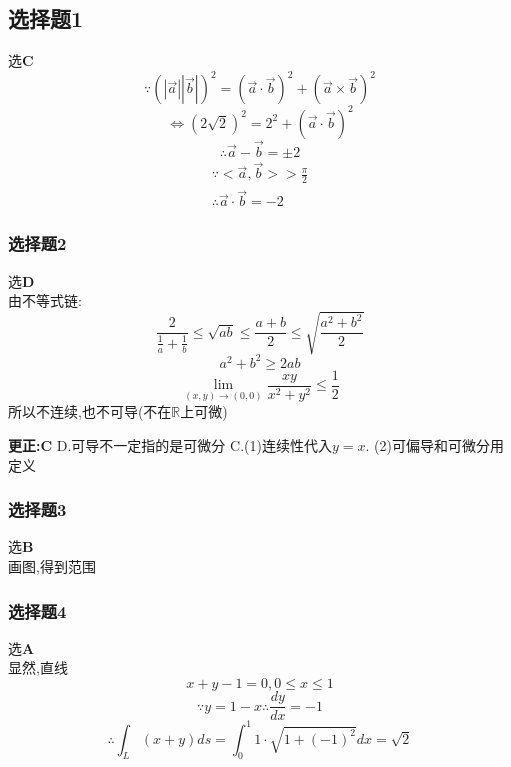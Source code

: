 \documentclass[a4paper,12pt]{ctexrep}
\begin{document}
\subsection{选择题1}
选\textbf{C}
\begin{equation*}
	\because\left(|\overrightarrow{a}||\overrightarrow{b}|\right)^2=\left(\overrightarrow{a}\cdot\overrightarrow{b}\right)^2+\left(\overrightarrow{a}\times\overrightarrow{b}\right)^2
\end{equation*}
\begin{equation*}
	\Leftrightarrow(2\sqrt{2})^{2}=2^{2}+(\overrightarrow{a}\cdot\overrightarrow{b})^{2}
\end{equation*}
\begin{equation*}
\therefore\overrightarrow{a}-\overrightarrow{b}=\pm2
\end{equation*}
\begin{equation*}
\begin{aligned}\because<\overrightarrow{a},\overrightarrow{b}>>\frac{\pi}{2}
		\\
\therefore\overrightarrow{a}\cdot\overrightarrow{b}=-2\end{aligned}\end{equation*}

\subsubsection{选择题2}
选\textbf{D} \\
由不等式链:
\begin{equation*}
\frac{2}{\frac{1}{a}+\frac{1}{b}}\leq\sqrt{ab}\leq\frac{a+b}{2}\leq\sqrt{\frac{a^{2}+b^{2}}{2}}
\end{equation*}
\begin{equation*}
	a^{2}+b^{2}\geq2ab
\end{equation*}
\begin{equation*}
	\operatorname*{lim}_{(x,y)\rightarrow(0,0)}\frac{xy}{x^2+y^2}\leq\frac{1}{2}
\end{equation*}
所以不连续,也不可导(不在$\mathbb{R}$上可微)

\textbf{更正:C}
D.可导不一定指的是可微分
C.(1)连续性代入$y=x$. (2)可偏导和可微分用定义

\subsubsection{选择题3}
选\textbf{B} \\
画图,得到范围

\subsubsection{选择题4}
选\textbf{A} \\
显然,直线\begin{equation*}
	x+y-1=0,0\leq x\leq1
\end{equation*}
\begin{equation*}
	\because y=1-x\therefore\frac{dy}{dx}=-1
\end{equation*}
\begin{equation*}
\therefore\int_{L}(x+y)ds=\int_{0}^{1}1\cdot\sqrt{1+(-1)^{2}}dx=\sqrt{2}
\end{equation*}
\end{document}
